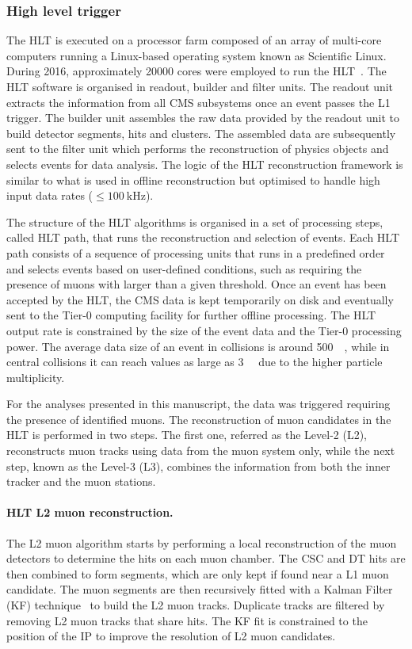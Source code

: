 \subsubsection{High level trigger}\label{sec:Experiment_CMS_Trigger_HLT}

The HLT is executed on a processor farm composed of an array of multi-core computers running a Linux-based operating system known as Scientific Linux. During 2016, approximately 20000 cores were employed to run the HLT~\cite{HLTHardware}. The HLT software is organised in readout, builder and filter units. The readout unit extracts the information from all CMS subsystems once an event passes the L1 trigger. The builder unit assembles the raw data provided by the readout unit to build detector segments, hits and clusters. The assembled data are subsequently sent to the filter unit which performs the reconstruction of physics objects and selects events for data analysis. The logic of the HLT reconstruction framework is similar to what is used in offline reconstruction but optimised to handle high input data rates ($\le\SI{100}{\kHz}$).

The structure of the HLT algorithms is organised in a set of processing steps, called HLT path, that runs the reconstruction and selection of events. Each HLT path consists of a sequence of processing units that runs in a predefined order and selects events based on user-defined conditions, such as requiring the presence of muons with \pt larger than a given threshold. Once an event has been accepted by the HLT, the CMS data is kept temporarily on disk and eventually sent to the Tier-0 computing facility for further offline processing. The HLT output rate is constrained by the size of the event data and the Tier-0 processing power. The average data size of an event in \Runpp collisions is around \SI{500}{\kilo\Bit}, while in central \RunPbPb collisions it can reach values as large as \SI{3}{\mega\Bit} due to the higher particle multiplicity.

For the analyses presented in this manuscript, the data was triggered requiring the presence of identified muons. The reconstruction of muon candidates in the HLT is performed in two steps. The first one, referred as the Level-2 (L2), reconstructs muon tracks using data from the muon system only, while the next step, known as the Level-3 (L3), combines the information from both the inner tracker and the muon stations.

\paragraph{HLT L2 muon reconstruction.} The L2 muon algorithm starts by performing a local reconstruction of the muon detectors to determine the hits on each muon chamber. The CSC and DT hits are then combined to form segments, which are only kept if found near a L1 muon candidate. The muon segments are then recursively fitted with a Kalman Filter (KF) technique~\cite{KalmanFilter} to build the L2 muon tracks. Duplicate tracks are filtered by removing L2 muon tracks that share hits. The KF fit is constrained to the position of the IP to improve the \pt resolution of L2 muon candidates.

